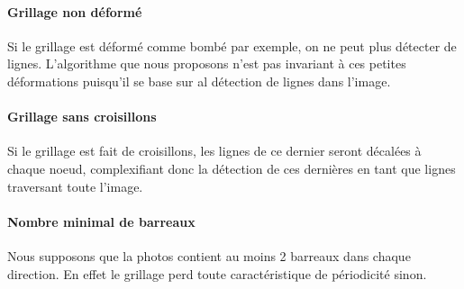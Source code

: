 \paragraph{Grillage non déformé}
Si le grillage est déformé comme bombé par exemple, on ne peut plus détecter de lignes. L'algorithme que nous proposons n'est pas invariant à ces petites déformations puisqu'il se base sur al détection de lignes dans l'image.

\paragraph{Grillage sans croisillons}
Si le grillage est fait de croisillons, les lignes de ce dernier seront décalées à chaque noeud, complexifiant donc la détection de ces dernières en tant que lignes traversant toute l'image.

\paragraph{Nombre minimal de barreaux}
Nous supposons que la photos contient au moins 2 barreaux dans chaque direction. En effet le grillage perd toute caractéristique de périodicité sinon.

